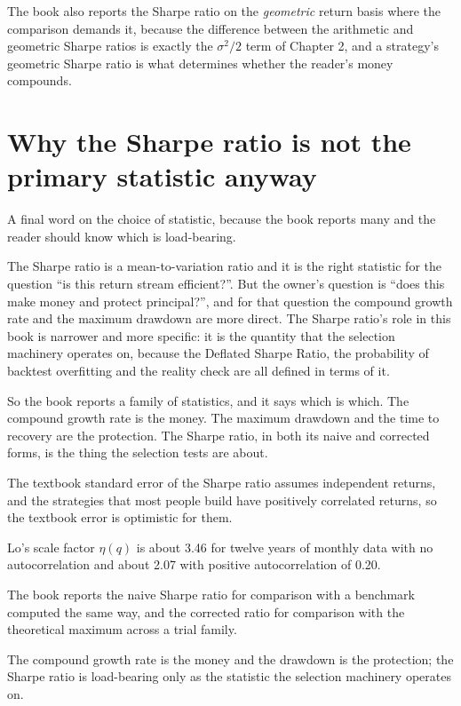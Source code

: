 The book also reports the Sharpe ratio on the \emph{geometric} return
basis where the comparison demands it, because the difference between the
arithmetic and geometric Sharpe ratios is exactly the \(\sigma^2/2\) term
of Chapter 2, and a strategy's geometric Sharpe ratio is what determines
whether the reader's money compounds.

\section{Why the Sharpe ratio is not the primary statistic anyway}

A final word on the choice of statistic, because the book reports many and
the reader should know which is load-bearing.

The Sharpe ratio is a mean-to-variation ratio and it is the right statistic
for the question ``is this return stream efficient?''. But the owner's
question is ``does this make money and protect principal?'', and for that
question the compound growth rate and the maximum drawdown are more
direct. The Sharpe ratio's role in this book is narrower and more
specific: it is the quantity that the selection machinery operates on,
because the Deflated Sharpe Ratio, the probability of backtest overfitting
and the reality check are all defined in terms of it.

So the book reports a family of statistics, and it says which is which.
The compound growth rate is the money. The maximum drawdown and the time
to recovery are the protection. The Sharpe ratio, in both its naive and
corrected forms, is the thing the selection tests are about.

\begin{keytakeaways}
\item The textbook standard error of the Sharpe ratio assumes independent
returns, and the strategies that most people build have positively
correlated returns, so the textbook error is optimistic for them.
\item Lo's scale factor \(\eta(q)\) is about 3.46 for twelve years of
monthly data with no autocorrelation and about 2.07 with positive
autocorrelation of 0.20.
\item The book reports the naive Sharpe ratio for comparison with a
benchmark computed the same way, and the corrected ratio for comparison
with the theoretical maximum across a trial family.
\item The compound growth rate is the money and the drawdown is the
protection; the Sharpe ratio is load-bearing only as the statistic the
selection machinery operates on.
\end{keytakeaways}
